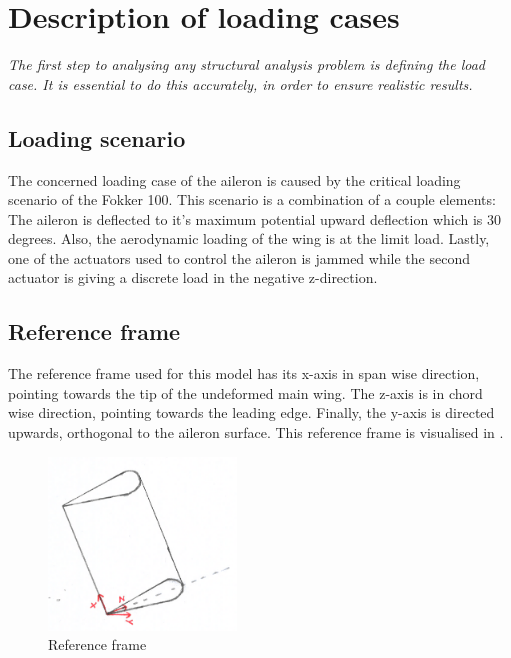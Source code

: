 \section{Description of loading cases}
\label{sec:loading}

\textit{The first step to analysing any structural analysis problem is defining the load case. It is essential to do this accurately, in order to ensure realistic results.
}

\subsection{Loading scenario}
The concerned loading case of the aileron is caused by the critical loading scenario of the Fokker 100. This scenario is a combination of a couple elements: The aileron is deflected to it's maximum potential upward deflection which is 30 degrees. Also, the aerodynamic loading of the wing is at the limit load. Lastly, one of the actuators used to control the aileron is jammed while the second actuator is giving a discrete load in the negative z-direction.

\subsection{Reference frame}
The reference frame used for this model has its x-axis in span wise direction, pointing towards the tip of the undeformed main wing. The z-axis is in chord wise direction, pointing towards the leading edge. Finally, the y-axis is directed upwards, orthogonal to the aileron surface. This reference frame is visualised in .

\begin{figure}[H]
    \centering
    \includegraphics[width=5cm,angle=90]{Images/reference_frame.pdf}
    \caption{Reference frame}
    \label{fig:reference_frame}
\end{figure}


